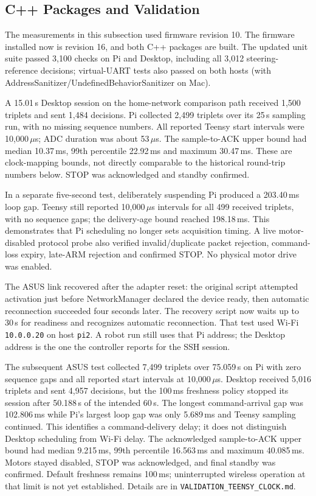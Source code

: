 \subsection{C++ Packages and Validation}
The measurements in this subsection used firmware revision 10. The firmware installed now is revision 16, and both C++ packages are built. The updated unit suite passed 3,100 checks on Pi and Desktop, including all 3,012 steering-reference decisions; virtual-UART tests also passed on both hosts (with AddressSanitizer/UndefinedBehaviorSanitizer on Mac).

A 15.01\,s Desktop session on the home-network comparison path received 1,500 triplets and sent 1,484 decisions. Pi collected 2,499 triplets over its 25\,s sampling run, with no missing sequence numbers. All reported Teensy start intervals were 10,000\,$\mu$s; ADC duration was about 53\,$\mu$s. The sample-to-ACK upper bound had median 10.37\,ms, 99th percentile 22.92\,ms and maximum 30.47\,ms. These are clock-mapping bounds, not directly comparable to the historical round-trip numbers below. STOP was acknowledged and standby confirmed.

In a separate five-second test, deliberately suspending Pi produced a 203.40\,ms loop gap. Teensy still reported 10,000\,$\mu$s intervals for all 499 received triplets, with no sequence gaps; the delivery-age bound reached 198.18\,ms. This demonstrates that Pi scheduling no longer sets acquisition timing. A live motor-disabled protocol probe also verified invalid/duplicate packet rejection, command-loss expiry, late-ARM rejection and confirmed STOP. No physical motor drive was enabled.

The ASUS link recovered after the adapter reset: the original script attempted activation just before NetworkManager declared the device ready, then automatic reconnection succeeded four seconds later. The recovery script now waits up to 30\,s for readiness and recognizes automatic reconnection. That test used Wi-Fi \texttt{10.0.0.20} on host \texttt{pi2}. A robot run still uses that Pi address; the Desktop address is the one the controller reports for the SSH session.

The subsequent ASUS test collected 7,499 triplets over 75.059\,s on Pi with zero sequence gaps and all reported start intervals at 10,000\,$\mu$s. Desktop received 5,016 triplets and sent 4,957 decisions, but the 100\,ms freshness policy stopped its session after 50.188\,s of the intended 60\,s. The longest command-arrival gap was 102.806\,ms while Pi's largest loop gap was only 5.689\,ms and Teensy sampling continued. This identifies a command-delivery delay; it does not distinguish Desktop scheduling from Wi-Fi delay. The acknowledged sample-to-ACK upper bound had median 9.215\,ms, 99th percentile 16.563\,ms and maximum 40.085\,ms. Motors stayed disabled, STOP was acknowledged, and final standby was confirmed. Default freshness remains 100\,ms; uninterrupted wireless operation at that limit is not yet established. Details are in \texttt{VALIDATION\_TEENSY\_CLOCK.md}.

